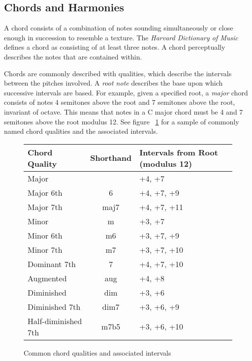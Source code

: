 \subsection{Chords and Harmonies}

A chord consists of a combination of notes sounding simultaneously or close enough in succession to resemble a texture. The \textit{Harvard Dictionary of Music} defines a chord as consisting of at least three notes\cite{harvdict}. A chord perceptually describes the notes that are contained within.

Chords are commonly described with qualities, which describe the intervals between the pitches involved. A \textit{root note} describes the base upon which successive intervals are based. For example, given a specified root, a \textit{major} chord consists of notes 4 semitones above the root and 7 semitones above the root, invariant of octave. This means that notes in a C major chord must be 4 and 7 semitones above the root modulus 12. See figure ~\ref{fig:qualitytable} for a sample of commonly named chord qualities and the associated intervals.

\begin{figure}[h!]
\begin{center}
\begin{tabular}{lcl}
\toprule
Chord Quality       & Shorthand & Intervals from Root (modulus 12) \\
\midrule
Major               &           & +4, +7 \\
Major 6th           & 6         & +4, +7, +9 \\
Major 7th           & maj7      & +4, +7, +11 \\
Minor               & m         & +3, +7 \\
Minor 6th           & m6        & +3, +7, +9 \\
Minor 7th           & m7        & +3, +7, +10 \\
Dominant 7th        & 7         & +4, +7, +10 \\
Augmented           & aug       & +4, +8 \\
Diminished          & dim       & +3, +6 \\
Diminished 7th      & dim7      & +3, +6, +9 \\
Half-diminished 7th & m7b5      & +3, +6, +10 \\
\bottomrule
\end{tabular}
\caption{Common chord qualities and associated intervals}
\label{fig:qualitytable}
\end{center}
\end{figure}

